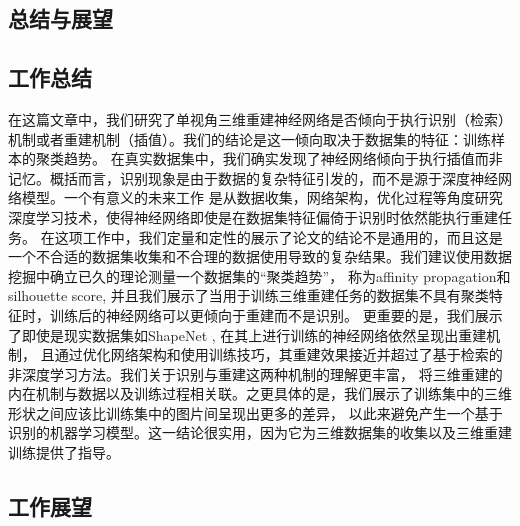 \documentclass[bachelor, nocolorlinks, printoneside]{seuthesis} %
\begin{document}
\begin{Main}
\chapter{总结与展望}

\section{工作总结}
在这篇文章中，我们研究了单视角三维重建神经网络是否倾向于执行识别（检索）机制或者重建机制（插值）。我们的结论是这一倾向取决于数据集的特征：训练样本的聚类趋势。
在真实数据集中，我们确实发现了神经网络倾向于执行插值而非记忆。概括而言，识别现象是由于数据的复杂特征引发的，而不是源于深度神经网络模型。一个有意义的未来工作
是从数据收集，网络架构，优化过程等角度研究深度学习技术，使得神经网络即使是在数据集特征偏倚于识别时依然能执行重建任务。
在这项工作中，我们定量和定性的展示了论文\cite{tatarchenko2019single}的结论不是通用的，而且这是一个不合适的数据集收集和不合理的数据使用导致的复杂结果。我们建议使用数据挖掘中确立已久的理论测量一个数据集的“聚类趋势”，
称为affinity propagation\cite{wang2008adaptive}和silhouette score\cite{van2015using}, 
并且我们展示了当用于训练三维重建任务的数据集不具有聚类特征时，训练后的神经网络可以更倾向于重建而不是识别。
更重要的是，我们展示了即使是现实数据集如ShapeNet \cite{chang2015shapenet}, 在其上进行训练的神经网络依然呈现出重建机制，
且通过优化网络架构和使用训练技巧，其重建效果接近并超过了基于检索的非深度学习方法。我们关于识别与重建这两种机制的理解更丰富，
将三维重建的内在机制与数据以及训练过程相关联。之更具体的是，我们展示了训练集中的三维形状之间应该比训练集中的图片间呈现出更多的差异，
以此来避免产生一个基于识别的机器学习模型。这一结论很实用，因为它为三维数据集的收集以及三维重建训练提供了指导。
\section{工作展望}

\end{Main} %



\end{document}
